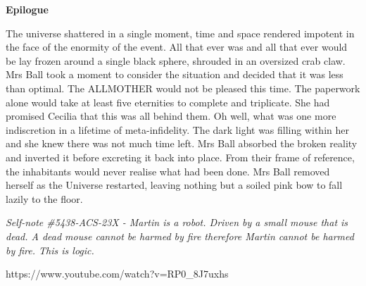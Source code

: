 \textbf{Epilogue}\medskip

The universe shattered in a single moment, time and space rendered impotent in the face of the enormity of the event. All that ever was and all that ever would be lay frozen around a single black sphere, shrouded in an oversized crab claw. Mrs Ball took a moment to consider the situation and decided that it was less than optimal. The ALLMOTHER would not be pleased this time. The paperwork alone would take at least five eternities to complete and triplicate. She had promised Cecilia that this was all behind them. Oh well, what was one more indiscretion in a lifetime of meta-infidelity. The dark light was filling within her and she knew there was not much time left. Mrs Ball absorbed the broken reality and inverted it before excreting it back into place. From their frame of reference, the inhabitants would never realise what had been done. Mrs Ball removed herself as the Universe restarted, leaving nothing but a soiled pink bow to fall lazily to the floor.\medskip

\textit{Self-note \#5438-ACS-23X - Martin is a robot. Driven by a small mouse that is dead. A dead mouse cannot be harmed by fire therefore Martin cannot be harmed by fire. This is logic.}\medskip

https://www.youtube.com/watch?v=RP0\_8J7uxhs\medskip

\vspace*{5mm}
